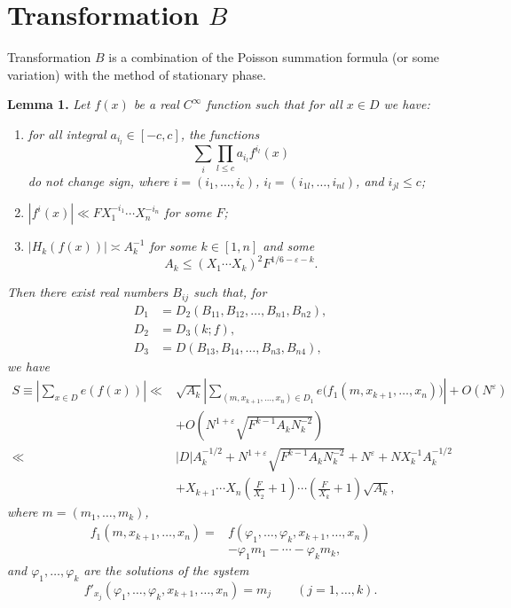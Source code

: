 \documentclass[10pt]{article}
\begin{document}
\section{Transformation $B$}

Transformation $B$ is a combination of the Poisson summation formula (or some variation) with the method of stationary phase.

\medskip
\noindent\textbf{Lemma 1.}
\textit{Let $f(x)$ be a real $C^\infty$ function such that for all $x\in D$ we have:}
\begin{enumerate}
  \item[(i)] \textit{for all integral $a_{i_l}\in[-c,c]$, the functions
  \[
    \sum_i\prod_{l\leqslant c}a_{i_l}f^{i_l}(x)
  \]
  do not change sign, where $i=(i_1,\ldots,i_c)$, $i_l=(i_{1l},\ldots,i_{nl})$, and $i_{jl}\leqslant c$;}
  \item[(ii)] \textit{$|f^i(x)|\ll FX_1^{-i_1}\cdots X_n^{-i_n}$ for some $F$;}
  \item[(iii)] \textit{$|H_k(f(x))|\asymp A_k^{-1}$ for some $k\in[1,n]$ and some
  \[
    A_k\leqslant(X_1\cdots X_k)^2F^{1/6-\varepsilon-k}.
  \]}
\end{enumerate}
\textit{Then there exist real numbers $B_{ij}$ such that, for
\[
\begin{aligned}
  D_1&=D_2(B_{11},B_{12},\ldots,B_{n1},B_{n2}),\\
  D_2&=D_3(k;f),\\
  D_3&=D(B_{13},B_{14},\ldots,B_{n3},B_{n4}),
\end{aligned}
\]
we have}
\[
\begin{aligned}
S\equiv\left|\sum_{x\in D}e(f(x))\right|
\ll{}&\sqrt{A_k}\left|\sum_{(m,x_{k+1},\ldots,x_n)\in D_1}
 e\bigl(f_1(m,x_{k+1},\ldots,x_n)\bigr)\right|+O(N^\varepsilon)\\
&+O\left(N^{1+\varepsilon}\sqrt{F^{k-1}A_kN_k^{-2}}\right)\\
\ll{}&|D|A_k^{-1/2}
 +N^{1+\varepsilon}\sqrt{F^{k-1}A_kN_k^{-2}}+N^\varepsilon
 +NX_k^{-1}A_k^{-1/2}\\
&+X_{k+1}\cdots X_n\left(\frac F{X_2}+1\right)\cdots
  \left(\frac F{X_k}+1\right)\sqrt{A_k},
\end{aligned}
\]
\textit{where $m=(m_1,\ldots,m_k)$,
\[
\begin{aligned}
f_1(m,x_{k+1},\ldots,x_n)
={}&f(\varphi_1,\ldots,\varphi_k,x_{k+1},\ldots,x_n)\\
&-\varphi_1m_1-\cdots-\varphi_km_k,
\end{aligned}
\]
and $\varphi_1,\ldots,\varphi_k$ are the solutions of the system
\[
  f'_{x_j}(\varphi_1,\ldots,\varphi_k,x_{k+1},\ldots,x_n)=m_j
  \qquad(j=1,\ldots,k).
\]}
\end{document}
